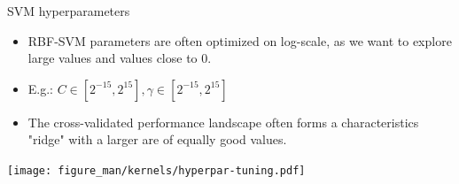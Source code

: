\begin{vbframe}{SVM hyperparameters}
\begin{itemize}
\item RBF-SVM parameters are often optimized on log-scale, as we want to explore
  large values and values close to 0.
\item E.g.: $C \in [2^{-15}, 2^{15}], \gamma \in [2^{-15}, 2^{15}]$
\item The cross-validated performance landscape often forms
  a characteristics "ridge" with a larger are of equally good values.
\end{itemize}

\begin{center}
  \texttt{[image: figure\_man/kernels/hyperpar-tuning.pdf]}
\end{center}

\end{vbframe}

\endlecture
